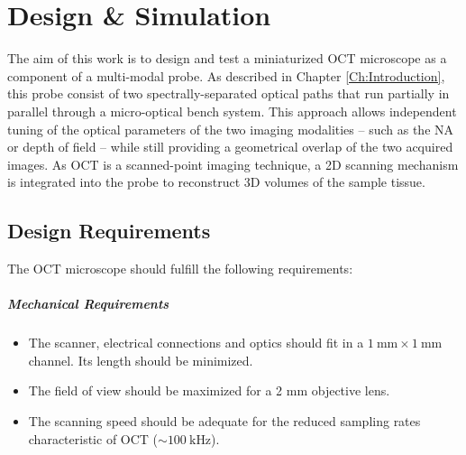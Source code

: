 %

\chapter{Design \& Simulation}
\label{Ch:DesignSimulation}	

The aim of this work is to design and test a miniaturized OCT microscope as a component of a multi-modal probe. As described in Chapter \ref{Ch:Introduction}, this probe consist of two spectrally-separated optical paths that run partially in parallel through a micro-optical bench system. This approach allows independent tuning of the optical parameters of the two imaging modalities -- such as the NA or depth of field -- while still providing a geometrical overlap of the two acquired images. As OCT is a scanned-point imaging technique, a 2D scanning mechanism is integrated into the probe to reconstruct 3D volumes of the sample tissue.

\section{Design Requirements}



The OCT microscope should fulfill the following requirements:

\paragraph{Mechanical Requirements} 
\begin{itemize}

\item The scanner, electrical connections and optics should fit in a $\SI{1}{\milli\meter} \times \SI{1}{\milli\meter}$ channel. Its length should be minimized.
\item The field of view should be maximized for a 2 mm objective lens.
\item The scanning speed should be adequate for the reduced sampling rates characteristic of OCT ($\sim \SI{100}{\kilo\hertz} $).
\end{itemize}


